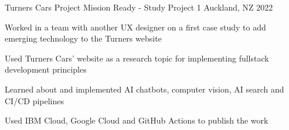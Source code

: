 \begin{cventries}
\cventry
{Turners Cars Project} %
{Mission Ready - Study Project 1} %
{Auckland, NZ} %
{2022} %
{
  \begin{cvitems} %
    \item {Worked in a team with another UX designer on a first case study to add emerging technology to the Turners website}
    \item {Used Turners Cars' website as a research topic for implementing fullstack development principles}
    \item {Learned about and implemented AI chatbots, computer vision, AI search and CI/CD pipelines}
    \item {Used IBM Cloud, Google Cloud and GitHub Actions to publish the work}
  \end{cvitems}
}


\end{cventries}
